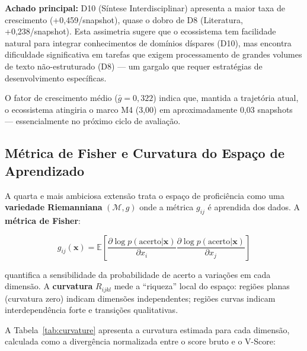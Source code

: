 \textbf{Achado principal:} D10 (Síntese Interdisciplinar) apresenta a maior
taxa de crescimento (+0,459/snapshot), quase o dobro de D8 (Literatura,
+0,238/snapshot). Esta assimetria sugere que o ecossistema tem facilidade
natural para integrar conhecimentos de domínios díspares (D10), mas encontra
dificuldade significativa em tarefas que exigem processamento de grandes
volumes de texto não-estruturado (D8) — um gargalo que requer estratégias
de desenvolvimento específicas.

O fator de crescimento médio ($\bar{g} = 0,322$) indica que, mantida a
trajetória atual, o ecossistema atingiria o marco M4 (3,00) em aproximadamente
0,03 snapshots — essencialmente no próximo ciclo de avaliação.

\subsection{Métrica de Fisher e Curvatura do Espaço de Aprendizado}

A quarta e mais ambiciosa extensão trata o espaço de proficiência como uma
\textbf{variedade Riemanniana} $(\mathcal{M}, g)$ onde a métrica $g_{ij}$ é
aprendida dos dados. A \textbf{métrica de Fisher}:

\begin{equation}\label{eq:fisher}
g_{ij}(\mathbf{x}) = \mathbb{E}\left[\frac{\partial \log p(\text{acerto}|\mathbf{x})}{\partial x_i} \frac{\partial \log p(\text{acerto}|\mathbf{x})}{\partial x_j}\right]
\end{equation}

quantifica a sensibilidade da probabilidade de acerto a variações em cada
dimensão. A \textbf{curvatura} $R_{ijkl}$ mede a ``riqueza'' local do espaço:
regiões planas (curvatura zero) indicam dimensões independentes; regiões curvas
indicam interdependência forte e transições qualitativas.

A Tabela~\ref{tab:curvature} apresenta a curvatura estimada para cada dimensão,
calculada como a divergência normalizada entre o score bruto e o V-Score:

